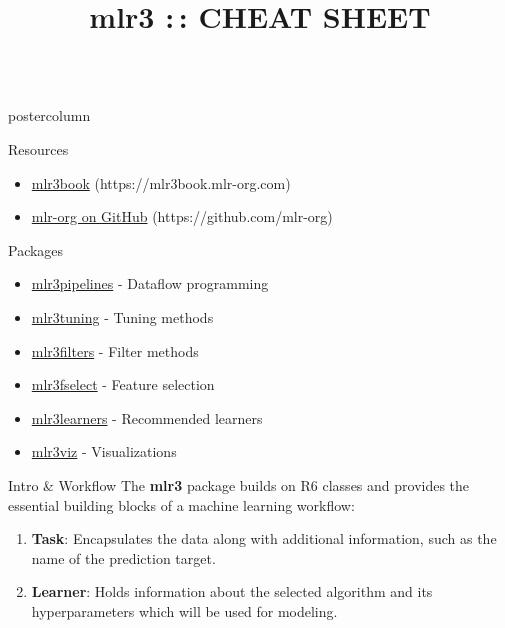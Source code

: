 \documentclass{beamer}
\title{mlr3 :\,: CHEAT SHEET} %
\newlength{\columnheight} %
\begin{document}
\begin{frame}[fragile]{}
	\begin{columns}
		\begin{column}{.245\textwidth}
			\begin{beamercolorbox}[center]{postercolumn}
				\begin{minipage}{.98\textwidth}
					\parbox[t][\columnheight]{\textwidth}{
						\begin{myblock}{Resources}
							\begin{itemize}
								\item \href{https://mlr3book.mlr-org.com/index.html}{mlr3book} (https://mlr3book.mlr-org.com)
								\item \href{https://github.com/mlr-org}{mlr-org on GitHub} (https://github.com/mlr-org)
							\end{itemize}
						\end{myblock}
						\begin{myblock}{Packages}
							\vfill
							\begin{itemize}
								\item \href{https://github.com/mlr-org/mlr3pipelines}{mlr3pipelines} - Dataflow programming
								\item \href{https://github.com/mlr-org/mlr3tuning}{mlr3tuning} - Tuning methods
								\item \href{https://github.com/mlr-org/mlr3filters}{mlr3filters} - Filter methods
								\item \href{https://github.com/mlr-org/mlr3fselect}{mlr3fselect} - Feature selection
								\item \href{https://github.com/mlr-org/mlr3learners}{mlr3learners} - Recommended learners
								\item \href{https://github.com/mlr-org/mlr3viz}{mlr3viz} - Visualizations
							\end{itemize}
						\end{myblock}
						\begin{myblock}{Intro \& Workflow}
							The \textbf{mlr3} package builds on R6 classes and provides the essential building
							blocks of a machine learning workflow:
							\vspace{1.5em}
							\begin{enumerate}
								\item \textbf{Task}: Encapsulates the data along with additional information, such as the name of the prediction target.
								\item \textbf{Learner}: Holds information about the selected algorithm and its hyperparameters which will be used for modeling.

\end{enumerate}
\end{myblock}}
\end{minipage}
\end{beamercolorbox}
\end{column}
\end{columns}
\end{frame}
\end{document}

